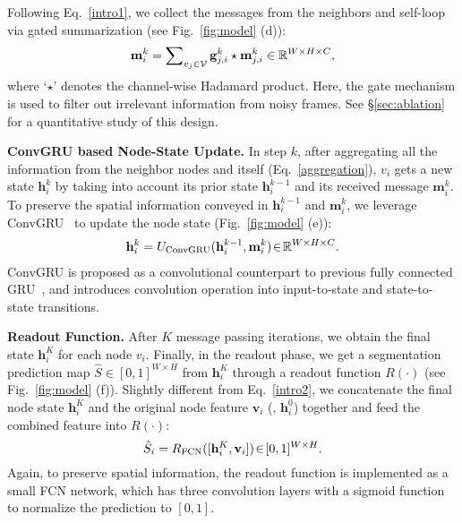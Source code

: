 \documentclass[10pt,twocolumn,letterpaper]{article}
\begin{document}
Following Eq.~\ref{intro1}, we collect the messages from the neighbors and self-loop via gated summarization (see Fig.~\ref{fig:model} (d)):
	\vspace*{-7pt}
\begin{equation}
\mathbf{m}_i^k = \sum\nolimits_{v_j \in\mathcal{V}}\mathbf{g}_{j,i}^k\star\mathbf{m}_{j,i}^k \in  \mathbb{R}^{W\times H\times C},
\label{aggregation}
	\vspace*{-3pt}
\end{equation}
where `$\star$' denotes the channel-wise Hadamard product. Here, the gate mechanism is used to filter out irrelevant information from noisy frames. See \S\ref{sec:ablation} for a quantitative study of this design.






\noindent\textbf{ConvGRU based Node-State Update.}
In step $k$, after aggregating all the information from the neighbor nodes and itself (Eq.~\ref{aggregation}), $v_i$ gets a new state $\mathbf{h}_i^{k}$ by taking into account its prior state $\mathbf{h}_i^{k-1}$ and its received message $\mathbf{m}_i^k$. To preserve the spatial information conveyed in $\mathbf{h}_i^{k-1}$ and $\mathbf{m}_i^k$, we leverage ConvGRU~\cite{ballas2015delving} to update the node state (Fig.~\ref{fig:model} (e)):
	\vspace*{-6pt}
\begin{equation}
\begin{aligned}
\mathbf{h}_i^k = U_{\text{ConvGRU}}(\mathbf{h}_i^{k-1}, \mathbf{m}_i^k) \!\in\!  \mathbb{R}^{ W\times H \times C}.
\label{convGRU}
\end{aligned}
	\vspace*{-1pt}
\end{equation}
ConvGRU is proposed as a convolutional counterpart to previous fully connected
GRU~\cite{cho2014learning}, and introduces convolution operation into input-to-state
and state-to-state transitions.


\noindent\textbf{Readout Function.}
After $K$ message passing iterations, we obtain the final state $\mathbf{h}_i^K$ for each node $v_i$.
Finally, in the readout phase, we get a segmentation prediction map $\hat{S}\!\in\![0,1]^{W\times H}$ from $\mathbf{h}_i^K$ through a readout function $R(\cdot)$  (see Fig.~\ref{fig:model} (f)). Slightly different from Eq.~\ref{intro2}, we concatenate the final node state $\mathbf{h}_i^K$ and the original node feature $\mathbf{v}_i$ (\ie, $\mathbf{h}_i^0$) together and feed the combined feature into $R(\cdot)$:
	\vspace*{-4pt}
\begin{equation}
\hat{S}_i = R_{\text{FCN}}([\mathbf{h}_i^K, \mathbf{v}_i]) \!\in\!  [0,1]^{ W\times H }.
\label{readout}
	\vspace*{-3pt}
\end{equation}
Again, to preserve spatial information, the readout function is implemented as a small FCN network, which has three convolution layers with a sigmoid function to normalize the prediction to $[0,1]$.
\end{document}
